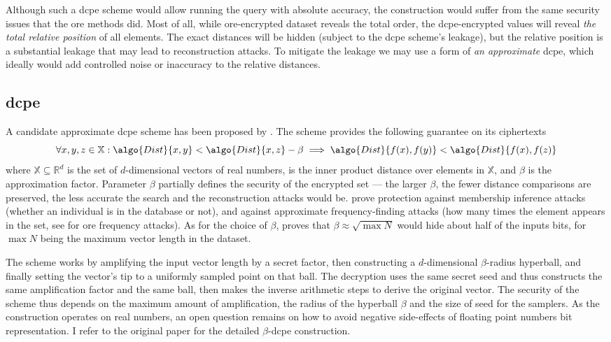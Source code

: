 		Although such a \acrfull{dcpe} scheme would allow running the query with absolute accuracy, the construction would suffer from the same security issues that the \acrshort{ore} methods did.
		Most of all, while \acrshort{ore}-encrypted dataset reveals the total order, the \acrshort{dcpe}-encrypted values will reveal \emph{the total relative position} of all elements.
		The exact distances will be hidden (subject to the \acrshort{dcpe} scheme's leakage), but the relative position is a substantial leakage that may lead to reconstruction attacks.
		To mitigate the leakage we may use a form of \emph{an approximate} \acrshort{dcpe}, which ideally would add controlled noise or inaccuracy to the relative distances.

		\subsection{\acrlong{dcpe}}

			A candidate approximate \acrshort{dcpe} scheme has been proposed by \textcite{dcpe}.
			The scheme provides the following guarantee on its ciphertexts
			\[
				\forall x, y, z \in \mathbb{X} : \algo{Dist}{x, y} < \algo{Dist}{x, z} - \beta \implies \algo{Dist}{f(x), f(y)} < \algo{Dist}{f(x), f(z)}
			\]
			where $\mathbb{X} \subseteq \mathbb{R}^d$ is the set of $d$-dimensional vectors of real numbers,  is the inner product distance over elements in $\mathbb{X}$, and $\beta$ is the approximation factor.
			Parameter $\beta$ partially defines the security of the encrypted set --- the larger $\beta$, the fewer distance comparisons are preserved, the less accurate the search and the reconstruction attacks would be.
			\textcite{dcpe} prove protection against membership inference attacks \cite{memebership-inference-attacks-knn} (whether an individual is in the database or not), and against approximate frequency-finding attacks (how many times the element appears in the set, see \cite{leakage-abuse-grubs-2017} for \acrshort{ore} frequency attacks).
			As for the choice of $\beta$, \cite{dcpe} proves that $\beta \approx \sqrt{\max N}$ would hide about half of the inputs bits, for $\max N$ being the maximum vector length in the dataset.

			The scheme works by amplifying the input vector length by a secret factor, then constructing a $d$-dimensional $\beta$-radius hyperball, and finally setting the vector's tip to a uniformly sampled point on that ball.
			The decryption uses the same secret seed and thus constructs the same amplification factor and the same ball, then makes the inverse arithmetic steps to derive the original vector.
			The security of the scheme thus depends on the maximum amount of amplification, the radius of the hyperball $\beta$ and the size of seed for the samplers.
			As the construction operates on real numbers, an open question remains on how to avoid negative side-effects of floating point numbers bit representation.
			I refer to the original paper \cite{dcpe} for the detailed $\beta$-\acrshort{dcpe} construction.

